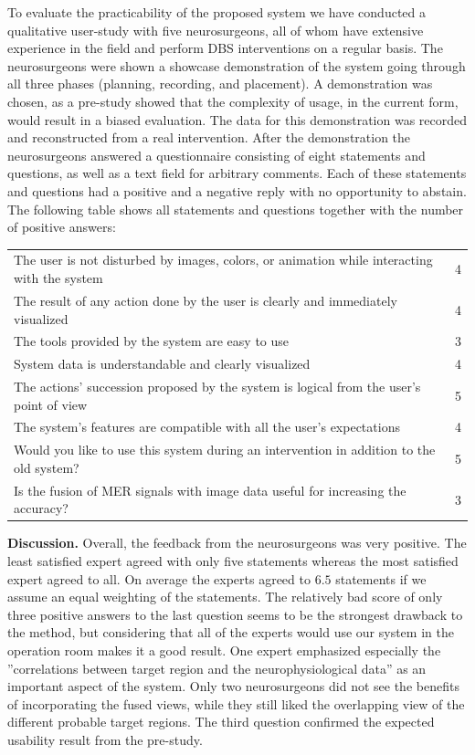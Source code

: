 \documentclass{egpubl}
\begin{document}
To evaluate the practicability of the proposed system we have conducted a qualitative user-study with five neurosurgeons, all of whom have extensive experience in the field and perform DBS interventions on a regular basis. The neurosurgeons were shown a showcase demonstration of the system going through all three phases (planning, recording, and placement). A demonstration was chosen, as a pre-study showed that the complexity of usage, in the current form, would result in a biased evaluation. The data for this demonstration was recorded and reconstructed from a real intervention. After the demonstration the neurosurgeons answered a questionnaire consisting of eight statements and questions, as well as a text field for arbitrary comments. Each of these statements and questions had a positive and a negative reply with no opportunity to abstain. The following table shows all statements and questions together with the number of positive answers:

\noindent \begin{tabular}{p{} c}
\hline
The user is not disturbed by images, colors, or animation while interacting with the system	& 4\\
The result of any action done by the user is clearly and immediately visualized				& 4\\
The tools provided by the system are easy to use												& 3\\
System data is understandable and clearly visualized											& 4\\
The actions' succession proposed by the system is logical from the user's point of view		& 5\\
The system's features are compatible with all the user's expectations							& 4\\
Would you like to use this system during an intervention in addition to the old system?		& 5\\
Is the fusion of MER signals with image data useful for increasing the accuracy?				& 3\\
\hline
\end{tabular}

\noindent \textbf{Discussion.} Overall, the feedback from the neurosurgeons was very positive. The least satisfied expert agreed with only five statements whereas the most satisfied expert agreed to all. On average the experts agreed to $6.5$ statements if we assume an equal weighting of the statements. The relatively bad score of only three positive answers to the last question seems to be the strongest drawback to the method, but considering that all of the experts would use our system in the operation room makes it a good result. One expert emphasized especially the ''correlations between target region and the neurophysiological data'' as an important aspect of the system. Only two neurosurgeons did not see the benefits of incorporating the fused views, while they still liked the overlapping view of the different probable target regions. The third question confirmed the expected usability result from the pre-study.
\end{document}
